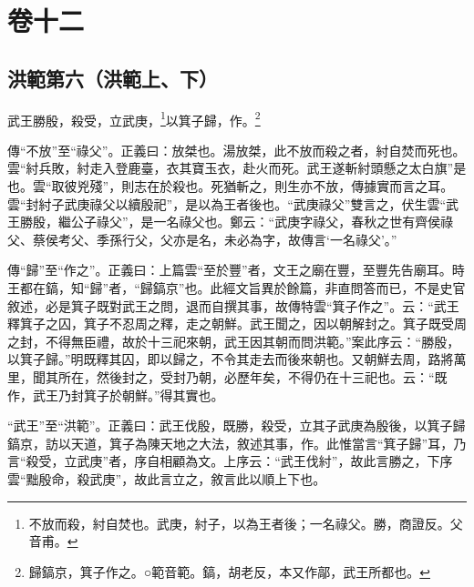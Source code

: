 

\chapter{卷十二}


\section{洪範第六（洪範上、下）}


武王勝殷，殺受，立武庚，\footnote{不放而殺，紂自焚也。武庚，紂子，以為王者後；一名祿父。勝，商證反。父音甫。}以箕子歸，作。\footnote{歸鎬京，箕子作之。○範音範。鎬，胡老反，本又作鄗，武王所都也。}

{\noindent\zhuan{}\fzbyks 傳“不放”至“祿父”。正義曰：放桀也。湯放桀，此不放而殺之者，紂自焚而死也。雲“紂兵敗，紂走入登鹿臺，衣其寶玉衣，赴火而死。武王遂斬紂頭懸之太白旗”是也。雲“取彼兇殘”，則志在於殺也。死猶斬之，則生亦不放，傳據實而言之耳。雲“封紂子武庚祿父以續殷祀”，是以為王者後也。“武庚祿父”雙言之，伏生雲“武王勝殷，繼公子祿父”，是一名祿父也。鄭云：“武庚字祿父，春秋之世有齊侯祿父、蔡侯考父、季孫行父，父亦是名，未必為字，故傳言‘一名祿父’。” \par}

{\noindent\zhuan{}\fzbyks 傳“歸”至“作之”。正義曰：上篇雲“至於豐”者，文王之廟在豐，至豐先告廟耳。時王都在鎬，知“歸”者，“歸鎬京”也。此經文旨異於餘篇，非直問答而已，不是史官敘述，必是箕子既對武王之問，退而自撰其事，故傳特雲“箕子作之”。云：“武王釋箕子之囚，箕子不忍周之釋，走之朝鮮。武王聞之，因以朝解封之。箕子既受周之封，不得無臣禮，故於十三祀來朝，武王因其朝而問洪範。”案此序云：“勝殷，以箕子歸。”明既釋其囚，即以歸之，不令其走去而後來朝也。又朝鮮去周，路將萬里，聞其所在，然後封之，受封乃朝，必歷年矣，不得仍在十三祀也。云：“既作，武王乃封箕子於朝鮮。”得其實也。 \par}

{\noindent\shu{}\fzkt “武王”至“洪範”。正義曰：武王伐殷，既勝，殺受，立其子武庚為殷後，以箕子歸鎬京，訪以天道，箕子為陳天地之大法，敘述其事，作。此惟當言“箕子歸”耳，乃言“殺受，立武庚”者，序自相顧為文。上序云：“武王伐紂”，故此言勝之，下序雲“黜殷命，殺武庚”，故此言立之，敘言此以順上下也。 \par}

